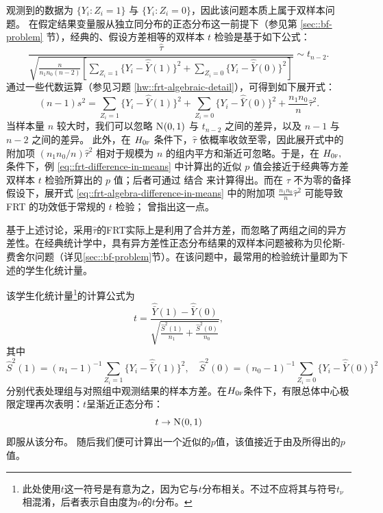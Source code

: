 观测到的数据为 $\{  Y_i: Z_i = 1 \}$ 与 $\{ Y_i : Z_i = 0 \}$，因此该问题本质上属于双样本问题。  
在假定结果变量服从独立同分布的正态分布这一前提下（参见第 \ref{sec::bf-problem} 节），经典的、假设方差相等的双样本 $t$ 检验是基于如下公式：
\begin{equation}\label{eq::two-sample-t-equalv}
\frac{  \hat{\tau}      }{  \sqrt{\frac{n}{n_1 n_0(n-2)}  \left[  \sum_{Z_i=1}  \{Y_i - \hat{\bar{Y}}(1)\}^2
+ \sum_{Z_i=0}  \{Y_i - \hat{\bar{Y}}(0)\}^2
    \right]  }    }   \sim t_{n-2}.
\end{equation}
通过一些代数运算（参见习题 \ref{hw::frt-algebraic-detail}），可得到如下展开式：
\begin{equation}\label{eq::frt-algebra-difference-in-means}
(n-1)s^2 = \sum_{Z_i=1}  \{Y_i - \hat{\bar{Y}}(1)\}^2 + \sum_{Z_i=0}  \{Y_i - \hat{\bar{Y}}(0)\}^2
+ \frac{n_1 n_0}{n} \hat{\tau}^2 .
\end{equation}
当样本量 $n$ 较大时，我们可以忽略 $\N01$ 与 $t_{n-2}$ 之间的差异，以及 $n-1$ 与 $n-2$ 之间的差异。  
此外，在 $H_{0\textsc{f}}$ 条件下，$\hat{\tau}$ 依概率收敛至零，因此展开式中的附加项 $ (n_1 n_0/n)\hat{\tau}^2$ 相对于规模为 $n$ 的组内平方和渐近可忽略。于是，在 $H_{0\textsc{f}},$ 条件下，例 \ref{eq::frt-difference-in-means} 中计算出的近似 $p$ 值会接近于经典等方差双样本 $t$ 检验所算出的 $p$ 值；后者可通过  结合  来计算得出。而在 $\tau$ 不为零的备择假设下，展开式 \eqref{eq::frt-algebra-difference-in-means} 中的附加项 $\frac{n_1 n_0}{n} \hat{\tau}^2$ 可能导致 FRT 的功效低于常规的 $t$ 检验；\citet{Ding:2014} 曾指出这一点。


基于上述讨论，采用$\hat{\tau}$的FRT实际上是利用了合并方差，而忽略了两组之间的异方差性。在经典统计学中，具有异方差性正态分布结果的双样本问题被称为贝伦斯-费舍尔问题（详见\ref{sec::bf-problem}节）。在该问题中，最常用的检验统计量即为下述的学生化统计量。 



\begin{example}[学生化统计量]
\label{eg::studentized-statistic}
该学生化统计量\footnote{此处使用$t$这一符号是有意为之，因为它与$t$分布相关。不过不应将其与符号$t_\nu$相混淆，后者表示自由度为$\nu$的$t$分布。}的计算公式为
$$
t = \frac{    \hat{\bar{Y}}(1)  -   \hat{\bar{Y}}(0)    }{  \sqrt{  \frac{  \hat{S}^2(1)  }{n_1}  + \frac{\hat{S}^2(0)}{n_0}  }   },
$$
其中
$$
\hat{S}^2(1) = (n_1 - 1)^{-1} \sum_{Z_i =1} \{ Y_i  -\hat{\bar{Y}}(1)   \}^2,\quad
\hat{S}^2(0) = (n_0 - 1)^{-1} \sum_{Z_i =0} \{ Y_i  -\hat{\bar{Y}}(0)   \}^2 
$$
分别代表处理组与对照组中观测结果的样本方差。在$H_{0\textsc{f}}$条件下，有限总体中心极限定理再次表明：$t$呈渐近正态分布：
$$
t \rightarrow \N01 
$$
即服从该分布。
随后我们便可计算出一个近似的$p$值，该值接近于由及所得出的$p$值。
\end{example}



